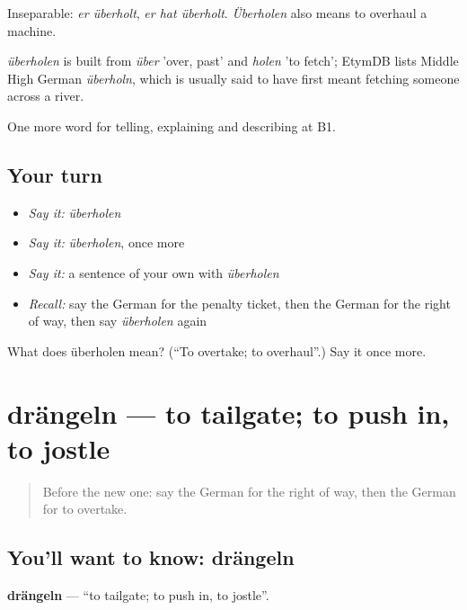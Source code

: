 Inseparable: \emph{er überholt}, \emph{er hat überholt}. \emph{Überholen} also means to overhaul a machine.

\begin{cousinweb}
\emph{überholen} is built from \emph{über} 'over, past' and \emph{holen} 'to fetch'; EtymDB lists Middle High German \emph{überholn}, which is usually said to have first meant fetching someone across a river.
\end{cousinweb}

\begin{grammarlens}[title={What you've built}]
One more word for telling, explaining and describing at B1.
\end{grammarlens}

\subsection*{Your turn}
\begin{itemize}
\raggedright
  \item \emph{Say it:} \emph{überholen}
  \item \emph{Say it:} \emph{überholen}, once more
  \item \emph{Say it:} a sentence of your own with \emph{überholen}
  \item \emph{Recall:} say the German for the penalty ticket, then the German for the right of way, then say \emph{überholen} again
\end{itemize}

\begin{tcolorbox}[breakable,colback=teal!4,colframe=teal!35!black,title={Before you move on}]
What does überholen mean? (\textquotedblleft{}To overtake; to overhaul\textquotedblright{}.) Say it once more.
\end{tcolorbox}
\section[drängeln]{drängeln — to tailgate; to push in, to jostle}

\label{lesson:GE-C408-draengeln}



\begin{quote}
Before the new one: say the German for the right of way, then the German for to overtake.
\end{quote}

\subsection*{You'll want to know: drängeln}
\textbf{drängeln} — \textquotedblleft{}to tailgate; to push in, to jostle\textquotedblright{}.

